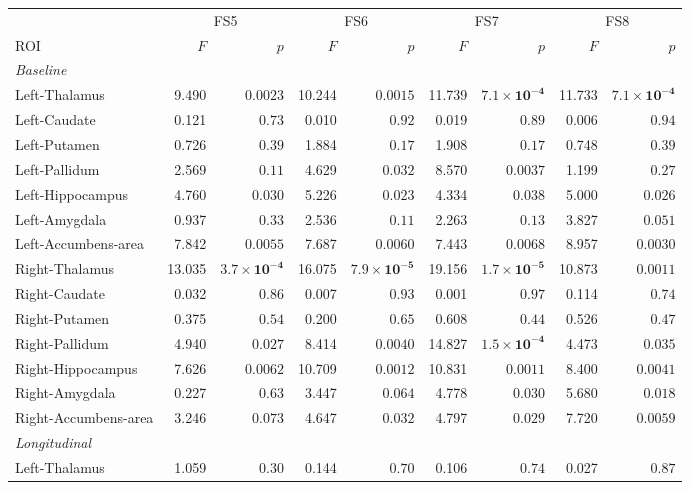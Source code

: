 \begin{tabular}{lrrrrrrrr}
\toprule
 & \multicolumn{2}{c}{FS5} & \multicolumn{2}{c}{FS6} & \multicolumn{2}{c}{FS7} & \multicolumn{2}{c}{FS8} \\
\cmidrule(lr){2-3}\cmidrule(lr){4-5}\cmidrule(lr){6-7}\cmidrule(lr){8-9}
ROI & $F$ & $p$ & $F$ & $p$ & $F$ & $p$ & $F$ & $p$ \\
\midrule
\multicolumn{9}{l}{\textit{Baseline}} \\
Left-Thalamus & 9.490 & $\mathbf{0.0023}$ & 10.244 & $\mathbf{0.0015}$ & 11.739 & $\mathbf{7.1{\times}10^{-4}}$ & 11.733 & $\mathbf{7.1{\times}10^{-4}}$ \\
Left-Caudate & 0.121 & $0.73$ & 0.010 & $0.92$ & 0.019 & $0.89$ & 0.006 & $0.94$ \\
Left-Putamen & 0.726 & $0.39$ & 1.884 & $0.17$ & 1.908 & $0.17$ & 0.748 & $0.39$ \\
Left-Pallidum & 2.569 & $0.11$ & 4.629 & $0.032$ & 8.570 & $0.0037$ & 1.199 & $0.27$ \\
Left-Hippocampus & 4.760 & $0.030$ & 5.226 & $0.023$ & 4.334 & $0.038$ & 5.000 & $0.026$ \\
Left-Amygdala & 0.937 & $0.33$ & 2.536 & $0.11$ & 2.263 & $0.13$ & 3.827 & $0.051$ \\
Left-Accumbens-area & 7.842 & $0.0055$ & 7.687 & $0.0060$ & 7.443 & $0.0068$ & 8.957 & $\mathbf{0.0030}$ \\
Right-Thalamus & 13.035 & $\mathbf{3.7{\times}10^{-4}}$ & 16.075 & $\mathbf{7.9{\times}10^{-5}}$ & 19.156 & $\mathbf{1.7{\times}10^{-5}}$ & 10.873 & $\mathbf{0.0011}$ \\
Right-Caudate & 0.032 & $0.86$ & 0.007 & $0.93$ & 0.001 & $0.97$ & 0.114 & $0.74$ \\
Right-Putamen & 0.375 & $0.54$ & 0.200 & $0.65$ & 0.608 & $0.44$ & 0.526 & $0.47$ \\
Right-Pallidum & 4.940 & $0.027$ & 8.414 & $0.0040$ & 14.827 & $\mathbf{1.5{\times}10^{-4}}$ & 4.473 & $0.035$ \\
Right-Hippocampus & 7.626 & $0.0062$ & 10.709 & $\mathbf{0.0012}$ & 10.831 & $\mathbf{0.0011}$ & 8.400 & $0.0041$ \\
Right-Amygdala & 0.227 & $0.63$ & 3.447 & $0.064$ & 4.778 & $0.030$ & 5.680 & $0.018$ \\
Right-Accumbens-area & 3.246 & $0.073$ & 4.647 & $0.032$ & 4.797 & $0.029$ & 7.720 & $0.0059$ \\
\midrule
\multicolumn{9}{l}{\textit{Longitudinal}} \\
Left-Thalamus & 1.059 & $0.30$ & 0.144 & $0.70$ & 0.106 & $0.74$ & 0.027 & $0.87$ \\

\end{tabular}
